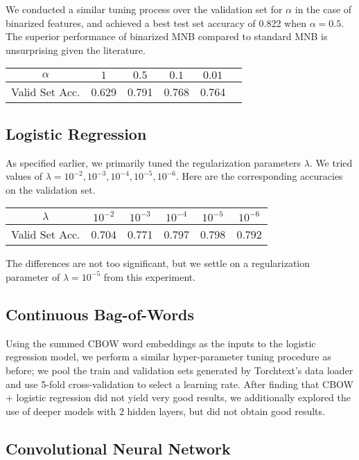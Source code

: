 \documentclass[11pt]{article}
\begin{document}
We conducted a similar tuning process over the validation set for $\alpha$ in the case of binarized features, and achieved a best test set accuracy of 0.822 when $\alpha = 0.5$. The superior performance of binarized MNB compared to standard MNB is unsurprising given the literature.

\begin{center}
	\begin{tabular}{ c | c c c c c}
		$\alpha$ & $1$ & $0.5$ & $0.1$ & $0.01$ \\
		\hline
		Valid Set Acc. & 0.629 & 0.791 & 0.768 & 0.764 
	\end{tabular}
\end{center}

\subsection{Logistic Regression}

As specified earlier, we primarily tuned the regularization parameters $\lambda$.  We tried values of $\lambda = 10^{-2}, 10^{-3}, 10^{-4}, 10^{-5}, 10^{-6}$.  Here are the corresponding accuracies on the validation set.

\begin{center}
\begin{tabular}{ c | c c c c c}
$\lambda$ & $10^{-2}$ & $10^{-3}$ & $10^{-4}$ & $10^{-5}$ & $10^{-6}$ \\
\hline
Valid Set Acc. & 0.704 & 0.771 & 0.797 & 0.798 & 0.792 
\end{tabular}
\end{center}
The differences are not too significant, but we settle on a regularization parameter of $\lambda = 10^{-5}$ from this experiment.  

\subsection{Continuous Bag-of-Words}
Using the summed CBOW word embeddings as the inputs to the logistic regression model, we perform a similar hyper-parameter tuning procedure as before; we pool the train and validation sets generated by Torchtext's data loader and use 5-fold cross-validation to select a learning rate. After finding that CBOW + logistic regression did not yield very good results, we additionally explored the use of deeper models with 2 hidden layers, but did not obtain good results.

\subsection{Convolutional Neural Network}
\end{document}

